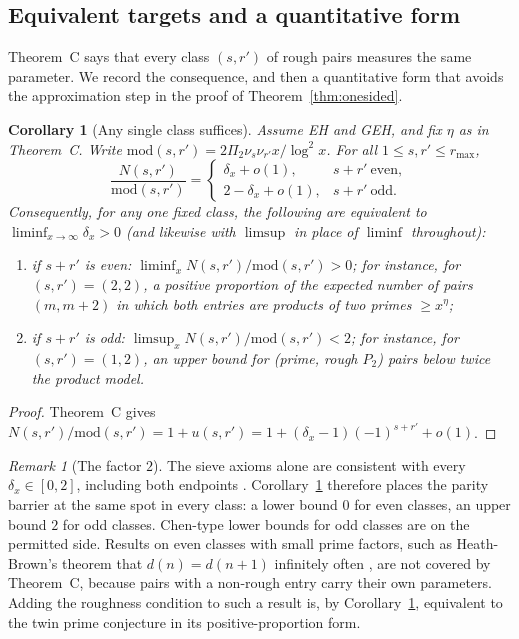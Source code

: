 \documentclass[11pt]{amsart}
\newtheorem{corollary}[theorem]{Corollary}
\theoremstyle{definition}
\theoremstyle{remark}
\newtheorem{remark}[theorem]{Remark}
\begin{document}
\subsection{Equivalent targets and a quantitative form}\label{sec:targets}
Theorem~C says that every class $(s,r')$ of rough pairs measures the same parameter. We record the consequence, and then a quantitative form that avoids the approximation step in the proof of Theorem~\ref{thm:onesided}.

\begin{corollary}[Any single class suffices]\label{cor:anyclass}
Assume EH and GEH, and fix $\eta$ as in Theorem~C. Write $\mathrm{mod}(s,r')=2\Pi_2\nu_s\nu_{r'}x/\log^2x$. For all $1\le s,r'\le r_{\max}$,
\[
\frac{N(s,r')}{\mathrm{mod}(s,r')}=\begin{cases}\delta_x+o(1),& s+r'\ \text{even},\\ 2-\delta_x+o(1),& s+r'\ \text{odd}.\end{cases}
\]
Consequently, for any one fixed class, the following are equivalent to $\liminf_{x\to\infty}\delta_x>0$ (and likewise with $\limsup$ in place of $\liminf$ throughout):
\begin{enumerate}
\item[(a)] if $s+r'$ is even: $\liminf_xN(s,r')/\mathrm{mod}(s,r')>0$; for instance, for $(s,r')=(2,2)$, a positive proportion of the expected number of pairs $(m,m+2)$ in which both entries are products of two primes $\ge x^\eta$;
\item[(b)] if $s+r'$ is odd: $\limsup_xN(s,r')/\mathrm{mod}(s,r')<2$; for instance, for $(s,r')=(1,2)$, an upper bound for (prime, rough $P_2$) pairs below twice the product model.
\end{enumerate}
\end{corollary}
\begin{proof}
Theorem~C gives $N(s,r')/\mathrm{mod}(s,r')=1+u(s,r')=1+(\delta_x-1)(-1)^{s+r'}+o(1)$.
\end{proof}

\begin{remark}[The factor $2$]
The sieve axioms alone are consistent with every $\delta_x\in[0,2]$, including both endpoints \cite{Tao16notes}. Corollary~\ref{cor:anyclass} therefore places the parity barrier at the same spot in every class: a lower bound $0$ for even classes, an upper bound $2$ for odd classes. Chen-type lower bounds for odd classes are on the permitted side. Results on even classes with small prime factors, such as Heath-Brown's theorem that $d(n)=d(n+1)$ infinitely often \cite{HB84}, are not covered by Theorem~C, because pairs with a non-rough entry carry their own parameters. Adding the roughness condition to such a result is, by Corollary~\ref{cor:anyclass}, equivalent to the twin prime conjecture in its positive-proportion form.
\end{remark}
\end{document}
